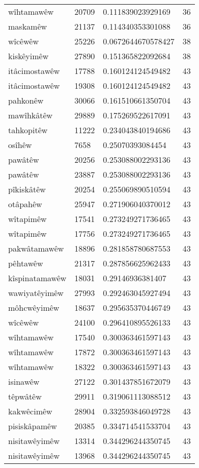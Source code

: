 \begin{longtable}{llll}
wîhtamawêw & 20709 & 0.111839023929169 & 36\\
maskamêw & 21137 & 0.114340353301088 & 36\\
wîcêwêw & 25226 & 0.0672644670578427 & 38\\
kiskêyimêw & 27890 & 0.151365822092684 & 38\\
itâcimostawêw & 17788 & 0.160124124549482 & 43\\
itâcimostawêw & 19308 & 0.160124124549482 & 43\\
pahkonêw & 30066 & 0.161510661350704 & 43\\
mawîhkâtêw & 29889 & 0.175269522617091 & 43\\
tahkopitêw & 11222 & 0.234043840194686 & 43\\
osîhêw & 7658 & 0.25070393084454 & 43\\
pawâtêw & 20256 & 0.253088002293136 & 43\\
pawâtêw & 23887 & 0.253088002293136 & 43\\
pîkiskâtêw & 20254 & 0.255069890510594 & 43\\
otâpahêw & 25947 & 0.271906040370012 & 43\\
wîtapimêw & 17541 & 0.273249271736465 & 43\\
wîtapimêw & 17756 & 0.273249271736465 & 43\\
pakwâtamawêw & 18896 & 0.281858780687553 & 43\\
pêhtawêw & 21317 & 0.287856625962433 & 43\\
kîspinatamawêw & 18031 & 0.29146936381407 & 43\\
wawiyatêyimêw & 27993 & 0.292463045927494 & 43\\
môhcwêyimêw & 18637 & 0.295635370446749 & 43\\
wîcêwêw & 24100 & 0.296410895526133 & 43\\
wîhtamawêw & 17540 & 0.300363461597143 & 43\\
wîhtamawêw & 17872 & 0.300363461597143 & 43\\
wîhtamawêw & 18322 & 0.300363461597143 & 43\\
isinawêw & 27122 & 0.301437851672079 & 43\\
têpwâtêw & 29911 & 0.319061113088512 & 43\\
kakwêcimêw & 28904 & 0.332593846049728 & 43\\
pisiskâpamêw & 20385 & 0.334714541533704 & 43\\
nisitawêyimêw & 13314 & 0.344296244350745 & 43\\
nisitawêyimêw & 13968 & 0.344296244350745 & 43\\

\end{longtable}
